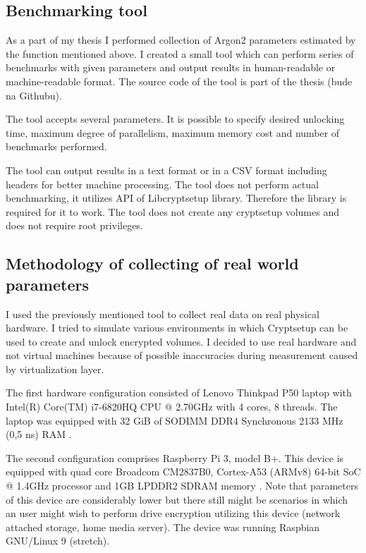 \documentclass[nolof]{fithesis3}
\begin{document}
\subsection{Benchmarking tool}
As a part of my thesis I performed collection of Argon2 parameters estimated by the function mentioned above. I created a small tool which can perform series of benchmarks with given parameters and output results in human-readable or machine-readable format. The source code of the tool is part of the thesis (bude na Githubu).

The tool accepts several parameters. It is possible to specify desired unlocking time, maximum degree of parallelism, maximum memory cost and number of benchmarks performed.

The tool can output results in a text format or in a CSV format including headers for better machine processing. The tool does not perform actual benchmarking, it utilizes API of Libcryptsetup library. Therefore the library is required for it to work. The tool does not create any cryptsetup volumes and does not require root privileges.

\subsection{Methodology of collecting of real world parameters}
\label{subsec:laptop}
I used the previously mentioned tool to collect real data on real physical hardware. I tried to simulate various environments in which Cryptsetup can be used to create and unlock encrypted volumes. I decided to use real hardware and not virtual machines because of possible inaccuracies during measurement caused by virtualization layer.

The first hardware configuration consisted of Lenovo Thinkpad P50 laptop with Intel(R) Core(TM) i7-6820HQ CPU @ 2.70GHz with 4 cores, 8 threads. The laptop was equipped with 32 GiB of SODIMM DDR4 Synchronous 2133 MHz (0,5 ns) RAM \parencite{laptopspecs}.

The second configuration comprises Raspberry Pi 3, model B+. This device is equipped with quad core Broadcom CM2837B0, Cortex-A53 (ARMv8) 64-bit SoC @ 1.4GHz processor and 1GB LPDDR2 SDRAM memory \parencite{raspberryspecs}. Note that parameters of this device are considerably lower but there still might be scenarios in which an user might wish to perform drive encryption utilizing this device (network attached storage, home media server). The device was running Raspbian GNU/Linux 9 (stretch).
\end{document}

